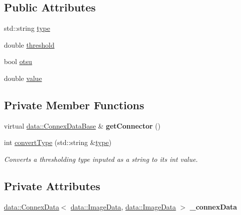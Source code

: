 \subsection*{Public Attributes}
\begin{DoxyCompactItemize}
\item 
std\+::string \hyperlink{classfilter_1_1algos_1_1_binary_a1f9320375cb787e7f950e5e4721b8022}{type}
\item 
double \hyperlink{classfilter_1_1algos_1_1_binary_ae6e7a193b3a4cfd3cfa96d4102333a06}{threshold}
\item 
bool \hyperlink{classfilter_1_1algos_1_1_binary_a35c09786deafa16fb4053f895c2471b3}{otsu}
\item 
double \hyperlink{classfilter_1_1algos_1_1_binary_a902a7141b452085bb5c1a50b0d0d6bb0}{value}
\end{DoxyCompactItemize}
\subsection*{Private Member Functions}
\begin{DoxyCompactItemize}
\item 
\mbox{\label{classfilter_1_1algos_1_1_binary_a07a91319b7715e67bcf83e76b4861a44}} 
virtual \hyperlink{classfilter_1_1data_1_1_connex_data_base}{data\+::\+Connex\+Data\+Base} \& {\bfseries get\+Connector} ()
\item 
int \hyperlink{classfilter_1_1algos_1_1_binary_a5c2003f1c00b4ae15430ecf42a1cb252}{convert\+Type} (std\+::string \&\hyperlink{classfilter_1_1algos_1_1_binary_a1f9320375cb787e7f950e5e4721b8022}{type})
\begin{DoxyCompactList}\small\item\em Converts a thresholding type inputed as a string to its int value. \end{DoxyCompactList}\end{DoxyCompactItemize}
\subsection*{Private Attributes}
\begin{DoxyCompactItemize}
\item 
\mbox{\label{classfilter_1_1algos_1_1_binary_a35da27dc35496b5e3b6d822f1c8d795c}} 
\hyperlink{classfilter_1_1data_1_1_connex_data}{data\+::\+Connex\+Data}$<$ \hyperlink{classfilter_1_1data_1_1_image_data}{data\+::\+Image\+Data}, \hyperlink{classfilter_1_1data_1_1_image_data}{data\+::\+Image\+Data} $>$ {\bfseries \+\_\+connex\+Data}
\end{DoxyCompactItemize}

